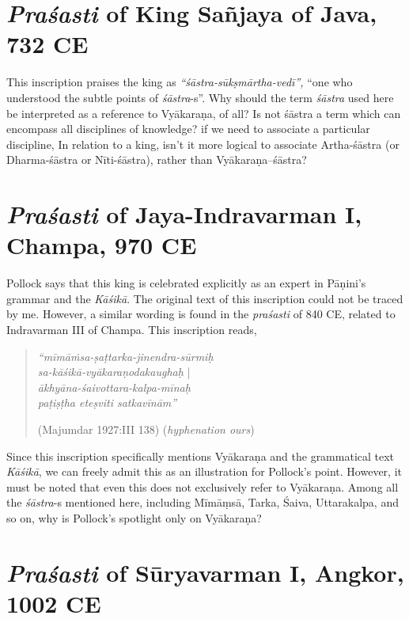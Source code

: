 \section{{\sl\bfseries Praśasti} of King Sañjaya of Java, 732 CE}\label{chap3-sec4}

This inscription praises the king as {\sl ``śāstra-sūkṣmārtha-vedī'',} ``one who understood the subtle points of {\sl śāstra}-s''. Why should the term {\sl śāstra} used here be interpreted as a reference to Vyākaraṇa, of all? Is not śāstra a term which can encompass all disciplines of knowledge? if we need to associate a particular discipline, In relation to a king, isn't it more logical to associate Artha-śāstra (or Dharma-śāstra or Nīti-śāstra), rather than Vyākaraṇa--śāstra?

\section{{\sl\bfseries Praśasti} of Jaya-Indravarman I, Champa, 970 CE}\label{chap3-sec5}

Pollock says that this king is celebrated explicitly as an expert in Pāṇini's grammar and the {\sl Kāśikā}.  The original text of this inscription could not be traced by me. However, a similar wording is found in the {\sl praśasti} of 840 CE, related to Indravarman III of Champa. This inscription reads, 
\begin{quote}
{{\sl ``mīmāṁsa-ṣaṭtarka-jinendra-sūrmiḥ}}\\
{{\sl sa-kāśikā-vyākaraṇodakaughaḥ}} |\\
{{\sl ākhyāna-śaivottara-kalpa-mīnaḥ}}\\
{{\sl paṭiṣṭha eteṣviti satkavīnām''}}

\hfill (Majumdar 1927:III 138) ({\sl hyphenation ours})
\end{quote}

Since this inscription specifically mentions Vyākaraṇa and the grammatical text {\sl Kāśikā},  we can freely admit this as an illustration for Pollock's point. However, it must be noted that even this does not exclusively refer to Vyākaraṇa. Among all the {\sl śāstra}-s mentioned here, including Mīmāṃsā, Tarka, Śaiva, Uttarakalpa, and so on, why is Pollock's spotlight only on Vyākaraṇa?

\section{{\sl\bfseries Praśasti} of Sūryavarman I, Angkor, 1002 CE}\label{chap3-sec6}

